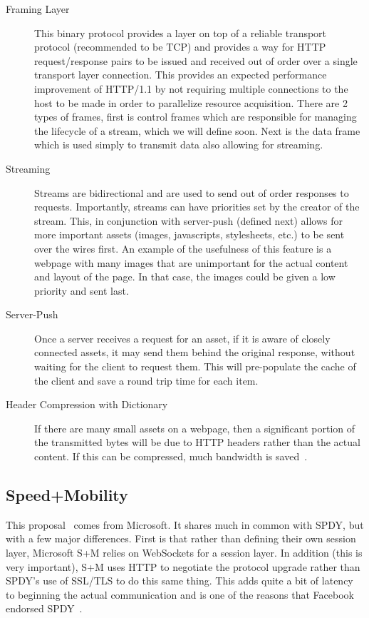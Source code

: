 \documentclass[11pt,letterpaper,notitlepage]{article}
\begin{document}
\begin{description}
\item[Framing Layer] This binary protocol provides a layer on top of a reliable transport
protocol (recommended to be TCP) and provides a way for HTTP request/response
pairs to be issued and received out of order over a single transport layer
connection.  This provides an expected performance improvement of HTTP/1.1 by
not requiring multiple connections to the host to be made in order to
parallelize resource acquisition. There are 2 types of frames, first is control
frames which are responsible for managing the lifecycle of a stream, which we
will define soon.  Next is the data frame which is used simply to transmit data
also allowing for streaming.
\item[Streaming] Streams are bidirectional and are used to send out of order
responses to requests. Importantly, streams can have priorities set by the
creator of the stream.  This, in conjunction with server-push (defined next)
allows for more important assets (images, javascripts, stylesheets, etc.) to be
sent over the wires first.  An example of the usefulness of this feature is a
webpage with many images that are unimportant for the actual content and layout
of the page.  In that case, the images could be given a low priority and sent
last.
\item[Server-Push] Once a server receives a request for an asset, if it is aware
of closely connected assets, it may send them behind the original response,
without waiting for the client to request them.  This will pre-populate the
cache of the client and save a round trip time for each item.
\item[Header Compression with Dictionary] If there are many small assets on a
webpage, then a significant portion of the transmitted bytes will be due to HTTP
headers rather than the actual content.  If this can be compressed, much
bandwidth is saved~\cite{binoy}.
\end{description}

\subsection{Speed+Mobility}
\label{sec:background/s+m}
This proposal~\cite{sm} comes from Microsoft.  It shares much in common with
SPDY, but with a few major differences. First is that rather than defining
their own session layer, Microsoft S+M relies on WebSockets for a session
layer.  In addition (this is very important), S+M uses HTTP to negotiate the
protocol upgrade rather than SPDY's use of SSL/TLS to do this same thing. This
adds quite a bit of latency to beginning the actual communication and is one of
the reasons that Facebook endorsed SPDY~\cite{fbook}.
\end{document}

